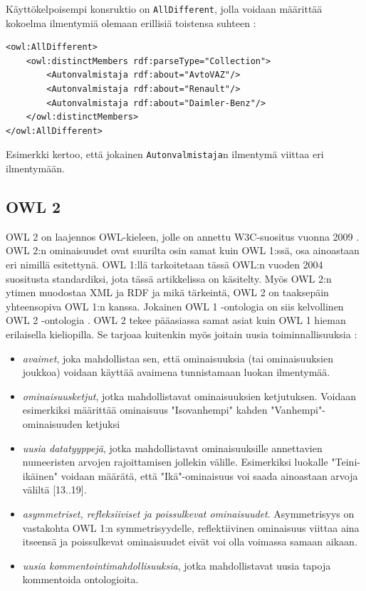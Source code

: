 \documentclass[finnish]{tktltiki2}
\theoremstyle{definition}
\theoremstyle{remark}
\begin{document}
Käyttökelpoisempi konsruktio on \texttt{AllDifferent}, jolla voidaan määrittää kokoelma ilmentymiä olemaan erillisiä toistensa suhteen \cite{SWM04}:
\begin{verbatim}
<owl:AllDifferent>
    <owl:distinctMembers rdf:parseType="Collection">
        <Autonvalmistaja rdf:about="AvtoVAZ"/>
        <Autonvalmistaja rdf:about="Renault"/>
        <Autonvalmistaja rdf:about="Daimler-Benz"/>
    </owl:distinctMembers>
</owl:AllDifferent>
\end{verbatim}
Esimerkki kertoo, että jokainen \texttt{Autonvalmistaja}n ilmentymä viittaa eri ilmentymään. 

\subsection{OWL 2}
OWL 2 on laajennos OWL-kieleen, jolle on annettu W3C-suositus vuonna 2009 \cite{OWL2}. OWL 2:n ominaisuudet ovat suurilta osin samat kuin OWL 1:ssä, osa ainoastaan eri nimillä esitettynä. OWL 1:llä tarkoitetaan tässä OWL:n vuoden 2004 suositusta standardiksi, jota tässä artikkelissa on käsitelty.  Myös OWL 2:n ytimen muodostaa XML ja RDF ja mikä tärkeintä, OWL 2 on taaksepäin yhteensopiva OWL 1:n kanssa. Jokainen OWL 1 -ontologia on siis kelvollinen OWL 2 -ontologia \cite{OWL2}. OWL 2 tekee pääasiassa samat asiat kuin OWL 1 hieman erilaisella kieliopilla. Se tarjoaa kuitenkin myös   joitain uusia toiminnallisuuksia \cite{OWL2}: 
\begin{itemize}
\item \textit{avaimet}, joka mahdollistaa sen, että ominaisuuksia (tai ominaisuuksien joukkoa) voidaan käyttää avaimena tunnistamaan luokan ilmentymää.
\item \textit{ominaisuusketjut}, jotka mahdollistavat ominaisuuksien ketjutuksen. Voidaan esimerkiksi määrittää ominaisuus "Isovanhempi" kahden "Vanhempi"-ominaisuuden ketjuksi
\item \textit{uusia datatyyppejä}, jotka mahdollistavat ominaisuuksille annettavien numeeristen arvojen rajoittamisen jollekin välille. Esimerkiksi luokalle "Teini-ikäinen" voidaan määrätä, että "Ikä"-ominaisuus voi saada ainoastaan arvoja väliltä [13..19].
\item \textit{asymmetriset, refleksiiviset ja poissulkevat ominaisuudet}. Asymmetrisyys on vastakohta OWL 1:n symmetrisyydelle, reflektiivinen ominaisuus viittaa aina itseensä ja poissulkevat ominaisuudet eivät voi olla voimassa samaan aikaan. 
\item \textit{uusia kommentointimahdollisuuksia}, jotka mahdollistavat uusia tapoja kommentoida ontologioita.   
\end{itemize}
\end{document}
